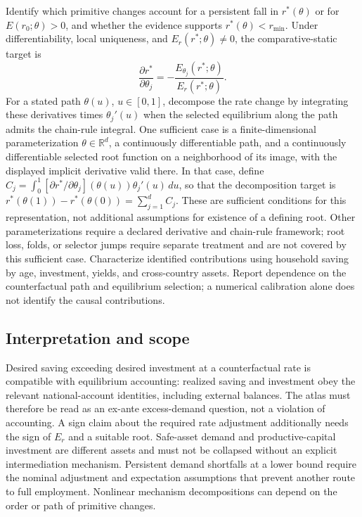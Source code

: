 \documentclass[11pt,a4paper]{article}
\newcommand{\R}{\mathbb R}
\begin{document}
Identify which primitive changes account for a persistent fall in $r^*(\theta)$ or for $E(r_0;\theta)>0$, and whether the evidence supports $r^*(\theta)<r_{\min}$. Under differentiability, local uniqueness, and $E_r(r^*;\theta)\ne0$, the comparative-static target is
\[
\frac{\partial r^*}{\partial\theta_j}=-\frac{E_{\theta_j}(r^*;\theta)}{E_r(r^*;\theta)}.
\]
For a stated path $\theta(u)$, $u\in[0,1]$, decompose the rate change by integrating these derivatives times $\theta_j'(u)$ when the selected equilibrium along the path admits the chain-rule integral. One sufficient case is a finite-dimensional parameterization $\theta\in\R^d$, a continuously differentiable path, and a continuously differentiable selected root function on a neighborhood of its image, with the displayed implicit derivative valid there. In that case, define $C_j=\int_0^1 [\partial r^*/\partial\theta_j](\theta(u))\theta_j'(u)\,du$, so that the decomposition target is $r^*(\theta(1))-r^*(\theta(0))=\sum_{j=1}^d C_j$. These are sufficient conditions for this representation, not additional assumptions for existence of a defining root. Other parameterizations require a declared derivative and chain-rule framework; root loss, folds, or selector jumps require separate treatment and are not covered by this sufficient case. Characterize identified contributions using household saving by age, investment, yields, and cross-country assets. Report dependence on the counterfactual path and equilibrium selection; a numerical calibration alone does not identify the causal contributions.

\subsection*{Interpretation and scope}

Desired saving exceeding desired investment at a counterfactual rate is compatible with equilibrium accounting: realized saving and investment obey the relevant national-account identities, including external balances. The atlas must therefore be read as an ex-ante excess-demand question, not a violation of accounting. A sign claim about the required rate adjustment additionally needs the sign of $E_r$ and a suitable root. Safe-asset demand and productive-capital investment are different assets and must not be collapsed without an explicit intermediation mechanism. Persistent demand shortfalls at a lower bound require the nominal adjustment and expectation assumptions that prevent another route to full employment. Nonlinear mechanism decompositions can depend on the order or path of primitive changes.
\end{document}
